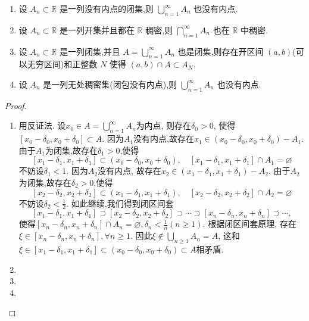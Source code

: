 \documentclass[../../main.tex]{subfiles}%
\begin{document}
\begin{theorem}[Baire纲定理]\label{theorem:Baire纲定理}
\begin{enumerate}
\item 设 \( A_n \subset \mathbb{R}\) 是一列没有内点的闭集,则 \(\bigcup_{n=1}^{\infty}{A_n} \)
也没有内点.

\item 设 \( A_n \subset \mathbb{R}\) 是一列开集并且都在 \(\mathbb{R}\) 稠密,则 \(\bigcap_{n=1}^{\infty}A_n \)
也在 \(\mathbb{R}\) 中稠密.

\item 设 \( A_n \subset \mathbb{R}\) 是一列闭集,并且 $A=\bigcup_{n=1}^{\infty}{A_n}$
也是闭集,则存在开区间 \((a, b)\)(可以无穷区间)和正整数 \( N \) 使得 \((a,b) \cap A \subset A_N\).

\item 设 \( A_n \) 是一列无处稠密集(闭包没有内点),则 \(\bigcup_{n=1}^{\infty} A_n \)
也没有内点.
\end{enumerate}
\end{theorem}
\begin{proof}
\begin{enumerate}
\item 用反证法. 设\(x_0\in A=\bigcup_{n=1}^{\infty} A_n\)为内点, 则存在\(\delta_0 > 0\), 使得\([x_0 - \delta_0,x_0 + \delta_0]\subset A\).
因为\(A_1\)没有内点,故存在\(x_1\in(x_0 - \delta_0,x_0 + \delta_0)-A_1\).由于\(A_1\)为闭集,故存在\(\delta_1 > 0\),使得
\[
[x_1 - \delta_1,x_1 + \delta_1]\subset(x_0 - \delta_0,x_0 + \delta_0),\quad [x_1 - \delta_1,x_1 + \delta_1]\cap A_1=\varnothing
\]
不妨设\(\delta_1 < 1\). 因为\(A_2\)没有内点, 故存在\(x_2\in(x_1 - \delta_1,x_1 + \delta_1)-A_2\). 由于\(A_2\)为闭集,故存在\(\delta_2 > 0\),使得
\[
[x_2 - \delta_2,x_2 + \delta_2]\subset(x_1 - \delta_1,x_1 + \delta_1),\quad [x_2 - \delta_2,x_2 + \delta_2]\cap A_2=\varnothing
\]
不妨设\(\delta_2 < \frac{1}{2}\). 如此继续,我们得到闭区间套
\[
[x_1 - \delta_1,x_1 + \delta_1]\supset[x_2 - \delta_2,x_2 + \delta_2]\supset\cdots\supset[x_n - \delta_n,x_n + \delta_n]\supset\cdots,
\]
使得\([x_n - \delta_n,x_n + \delta_n]\cap A_n=\varnothing,\delta_n < \frac{1}{n}(n\geqslant1)\).
根据闭区间套原理, 存在\(\xi\in[x_n - \delta_n,x_n + \delta_n],\forall n\geqslant1\). 因此\(\xi\notin\bigcup_{n\geqslant1}A_n = A\),
这和\(\xi\in[x_1 - \delta_1,x_1 + \delta_1]\subset(x_0 - \delta_0,x_0 + \delta_0)\subset A\)相矛盾.

\item 

\item 

\item 
\end{enumerate}
\end{proof}
\end{document}
